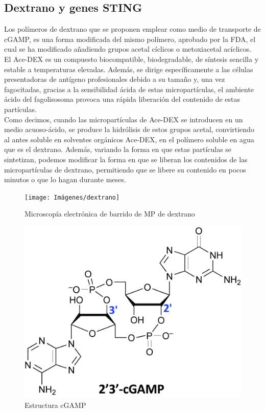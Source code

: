 \documentclass[a4paper,11pt]{article}
\begin{document}
\subsection{Dextrano y genes STING}
Los polímeros de dextrano que se proponen emplear como medio de transporte de cGAMP, es una forma modificada del mismo polímero, aprobado por la FDA, el cual se ha modificado añadiendo grupos acetal cíclicos o metoxiacetal acíclicos.
\\El Ace-DEX es un compuesto biocompatible, biodegradable, de síntesis sencilla y estable a temperaturas elevadas. Además, se dirige específicamente a las células presentadoras de antígeno profesionales debido a su tamaño y, una vez fagocitadas, gracias a la sensibilidad ácida de estas micropartículas, el ambiente ácido del fagolisosoma provoca una rápida liberación del contenido de estas partículas.
\\Como decimos, cuando las micropartículas de Ace-DEX se introducen en un medio acuoso-ácido, se produce la hidrólisis de estos grupos acetal, convirtiendo al antes soluble en solventes orgánicos Ace-DEX, en el polímero soluble en agua que es el dextrano. Además, variando la forma en que estas partículas se sintetizan, podemos modificar la forma en que se liberan los contenidos de las micropartículas de dextrano, permitiendo que se libere su contenido en pocos minutos o que lo hagan durante meses.
\begin{figure}[h]
	\centering
	\texttt{[image: Imágenes/dextrano]}
	\caption{Microscopía electrónica de barrido de MP de dextrano}
	
	\includegraphics[scale=0.1]{Imágenes/GAMP}
	\caption{Estructura cGAMP}
\end{figure}
\end{document}

